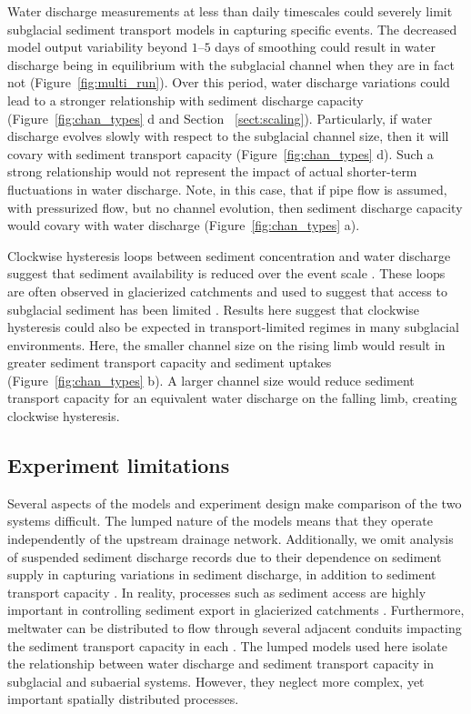 \documentclass[esurf, manuscript]{copernicus}
\begin{document}
Water discharge measurements at less than daily timescales could severely limit subglacial sediment transport models in capturing specific events.
The decreased model output variability beyond $1$--$5$ days of smoothing could result in water discharge being in equilibrium with the subglacial channel when they are in fact not (Figure~\ref{fig:multi_run}).
Over this period, water discharge variations could lead to a stronger relationship with sediment discharge capacity (Figure~\ref{fig:chan_types} d and Section ~\ref{sect:scaling}).
Particularly, if water discharge evolves slowly with respect to the subglacial channel size, then it will covary with sediment transport capacity (Figure~\ref{fig:chan_types} d).
Such a strong relationship would not represent the impact of actual shorter-term fluctuations in water discharge.
Note, in this case, that if  pipe flow is assumed, with pressurized flow, but no channel evolution, then  sediment discharge capacity would covary with water discharge (Figure~\ref{fig:chan_types} a).


Clockwise hysteresis loops between sediment concentration and water discharge suggest that sediment availability is reduced over the event scale \citep[][]{williams1989}.
These loops are often observed in glacierized catchments and used to suggest that access to subglacial sediment has been limited \citep[e.g.][]{collins1979,willis1996,richards2003,stott2007,delaney2018}.
Results here suggest that clockwise hysteresis could also be expected in transport-limited regimes in many subglacial environments.
Here, the smaller channel size on the rising limb would result in greater sediment transport capacity and sediment uptakes (Figure~\ref{fig:chan_types} b).
A larger channel size would reduce sediment transport capacity for an equivalent water discharge on the falling limb, creating clockwise hysteresis. 

\subsection{Experiment limitations}

Several aspects of the models and experiment design make comparison of the two systems difficult. 
The lumped nature of the models means that they operate independently of the upstream drainage network.
Additionally, we omit analysis of suspended sediment discharge records due to their dependence on sediment supply in capturing variations in sediment discharge, in addition to sediment transport capacity \citep[e.g.][]{delaney2019}.
In reality, processes such as sediment access are highly important in controlling sediment export in glacierized catchments \citep[e.g.][]{herman2015,vergara2022}.
Furthermore, meltwater can be distributed to flow through several adjacent conduits impacting the sediment transport capacity in each \citep[e.g.][]{werder2013,hewitt2019,delaney2023}.
The lumped models used here isolate the relationship between water discharge and sediment transport capacity in subglacial and subaerial systems. 
However, they neglect more complex, yet important spatially distributed processes.
\end{document}
